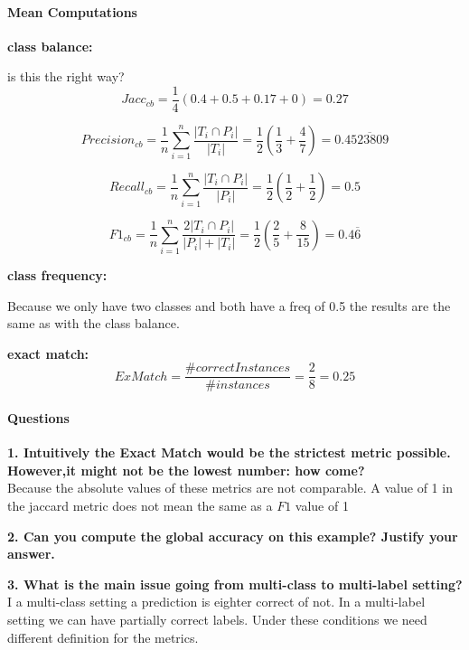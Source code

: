 \documentclass[10pt]{article}
\begin{document}
\paragraph{Mean Computations\\}

\textbf{class balance:}

is this the right way?
 $$Jacc_{cb} = \frac{1}{4}\left(0.4+0.5+0.17+0\right)= 0.27$$
 
$$Precision_{cb} =\frac{1}{n}\sum_{i=1}^{n} \frac{|{T_i}\cap{P_i}|}{|T_i|}= \frac{1}{2}\left(\frac{1}{3}+\frac{4}{7}\right) = 0.4\overline{523809}$$

$$Recall_{cb} =\frac{1}{n}\sum_{i=1}^{n} \frac{|{T_i}\cap{P_i}|}{|P_i|} = \frac{1}{2} \left(\frac{1}{2} + \frac{1}{2}\right) = 0.5$$
 
$$F1_{cb} =\frac{1}{n}\sum_{i=1}^{n} \frac{2|{T_i}\cap{P_i}|}{|P_i|+|T_i|} = \frac{1}{2}\left(\frac{2}{5}+\frac{8}{15}\right) = 0.4\overline{6}$$

\textbf{class frequency:}

Because we only have two classes and both have a freq of 0.5 the results are the same as with the class balance.

\textbf{exact match:}
$$ ExMatch = \frac{\#correct Instances}{\# instances} = \frac{2}{8} = 0.25 $$

\paragraph{Questions\\}

\textbf{1. Intuitively the Exact Match would be the strictest metric possible. However,it might not be the lowest number: how come?\\}
Because the absolute values of these metrics are not comparable. A value of 1 in the jaccard metric does not mean the same as a $F1$ value of 1

\textbf{2. Can you compute the global accuracy on this example? Justify your answer.\\}

\textbf{3. What is the main issue going from multi-class to multi-label setting?\\}
I a multi-class setting a prediction is eighter correct of not. In a multi-label setting we can have partially correct labels. Under these conditions we need different definition for the metrics.

   
\end{document}
